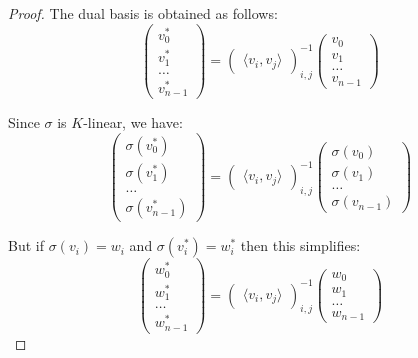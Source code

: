 \documentclass{article}
\begin{document}
\begin{proof}
The dual basis is obtained as follows:
\begin{equation}
\begin{pmatrix}
v_0^* \\ v_1^* \\ \ldots \\ v_{n-1}^*
\end{pmatrix}
=
\begin{pmatrix}
\langle v_i,v_j \rangle
\end{pmatrix}^{-1}_{i,j}
\begin{pmatrix}
v_0 \\ v_1 \\ \ldots \\ v_{n-1}
\end{pmatrix}
\end{equation}

Since $\sigma$ is $K$-linear, we have:
\begin{equation}
\begin{pmatrix}
\sigma(v_0^*) \\ \sigma(v_1^*) \\ \ldots \\ \sigma(v_{n-1}^*)
\end{pmatrix}
=
\begin{pmatrix}
\langle v_i,v_j \rangle
\end{pmatrix}^{-1}_{i,j}
\begin{pmatrix}
\sigma(v_0) \\ \sigma(v_1) \\ \ldots \\ \sigma(v_{n-1})
\end{pmatrix}
\end{equation}

But if $\sigma(v_i) = w_i$ and $\sigma(v_i^*) = w_i^*$ then this simplifies:
\begin{equation}
\begin{pmatrix}
w_0^* \\ w_1^* \\ \ldots \\ w_{n-1}^*
\end{pmatrix}
=
\begin{pmatrix}
\langle v_i,v_j \rangle
\end{pmatrix}^{-1}_{i,j}
\begin{pmatrix}
w_0 \\ w_1 \\ \ldots \\ w_{n-1}
\end{pmatrix}
\end{equation}


\end{proof}
\end{document}
